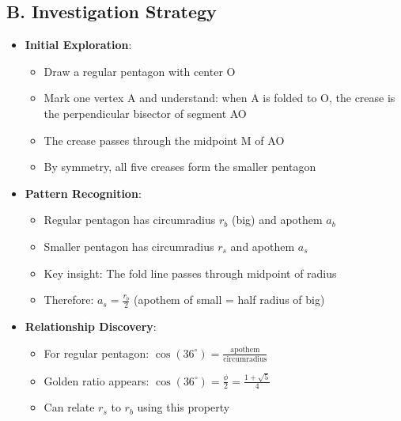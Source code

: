 \documentclass[12pt]{article}
\begin{document}
\begin{strategicbox}
\subsection*{B. Investigation Strategy}
\begin{itemize}[leftmargin=*]
    \item \textbf{Initial Exploration}: 
    \begin{itemize}
        \item Draw a regular pentagon with center O
        \item Mark one vertex A and understand: when A is folded to O, the crease is the perpendicular bisector of segment AO
        \item The crease passes through the midpoint M of AO
        \item By symmetry, all five creases form the smaller pentagon
    \end{itemize}
    \item \textbf{Pattern Recognition}: 
    \begin{itemize}
        \item Regular pentagon has circumradius $r_b$ (big) and apothem $a_b$
        \item Smaller pentagon has circumradius $r_s$ and apothem $a_s$
        \item Key insight: The fold line passes through midpoint of radius
        \item Therefore: $a_s = \frac{r_b}{2}$ (apothem of small = half radius of big)
    \end{itemize}
    \item \textbf{Relationship Discovery}: 
    \begin{itemize}
        \item For regular pentagon: $\cos(36^\circ) = \frac{\text{apothem}}{\text{circumradius}}$
        \item Golden ratio appears: $\cos(36^\circ) = \frac{\phi}{2} = \frac{1+\sqrt{5}}{4}$
        \item Can relate $r_s$ to $r_b$ using this property
    \end{itemize}
\end{itemize}


\end{strategicbox}
\end{document}

